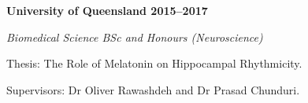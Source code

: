 \textbf{University of Queensland \hfill 2015--2017} \par
\textit{Biomedical Science BSc and Honours (Neuroscience)} \par
Thesis: The Role of Melatonin on Hippocampal Rhythmicity.\par
Supervisors: Dr Oliver Rawashdeh and Dr Prasad Chunduri.\par